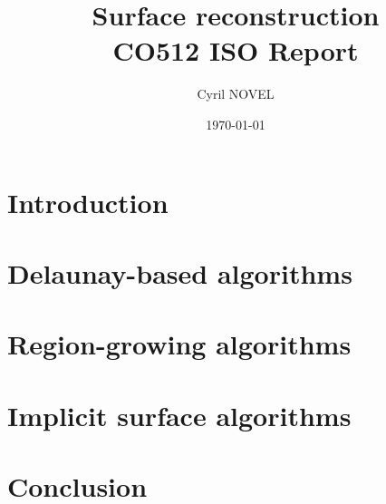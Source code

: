 \documentclass[a4paper]{article}
\title{Surface reconstruction\\
\large{CO512 ISO Report}}
\author{Cyril NOVEL}
\date{\today}
\begin{document}
\maketitle
\newpage

\section{Introduction}

\section{Delaunay-based algorithms}

\section{Region-growing algorithms}

\section{Implicit surface algorithms}


\section{Conclusion}
\end{document}
